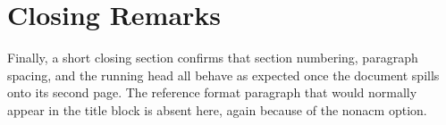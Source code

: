 \documentclass[acmsmall,nonacm,balance=false,natbib=false]{acmart}
\begin{document}
\section{Closing Remarks}
Finally, a short closing section confirms that section numbering, paragraph
spacing, and the running head all behave as expected once the document spills
onto its second page. The reference format paragraph that would normally appear
in the title block is absent here, again because of the nonacm option.
\end{document}
